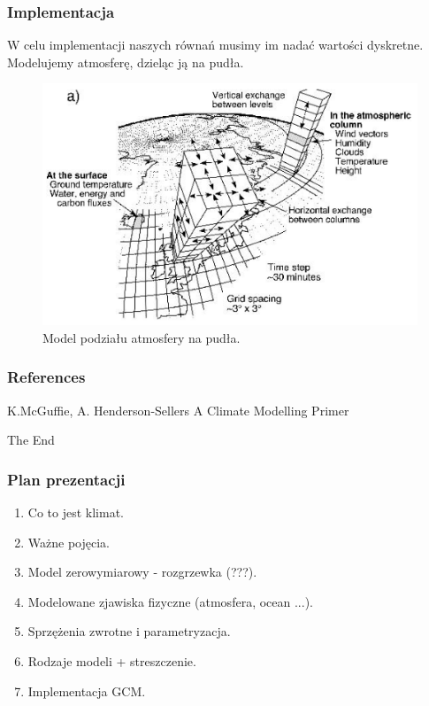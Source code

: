 \documentclass{beamer}
\begin{document}
\begin{frame}
	\frametitle{Implementacja}
	W celu implementacji naszych równań musimy im nadać wartości dyskretne.
	Modelujemy atmosferę, dzieląc ją na pudła.
	
	\begin{figure}[h]
		\begin{center}
			\includegraphics[width=0.7\linewidth]{images/box.png}
			\caption{Model podziału atmosfery na pudła.}
		\end{center}
	\end{figure}
	
\end{frame}

\begin{frame}
	\frametitle{References}
	\footnotesize{
		\begin{thebibliography}{99} %
			 K.McGuffie, A. Henderson-Sellers
			\newblock A Climate Modelling Primer
			
		\end{thebibliography}
	}
\end{frame}


\begin{frame}
	\Huge{\centerline{The End}}
\end{frame}
\begin{frame}
	\frametitle{Plan prezentacji}
	\begin{enumerate}
		\item Co to jest klimat.
		\item Ważne pojęcia.
		\item Model zerowymiarowy - rozgrzewka (???).
		\item Modelowane zjawiska fizyczne (atmosfera, ocean ...).
		\item Sprzężenia zwrotne i parametryzacja.
		\item Rodzaje modeli + streszczenie.
		\item Implementacja GCM.
	\end{enumerate}
\end{frame}
\end{document}
